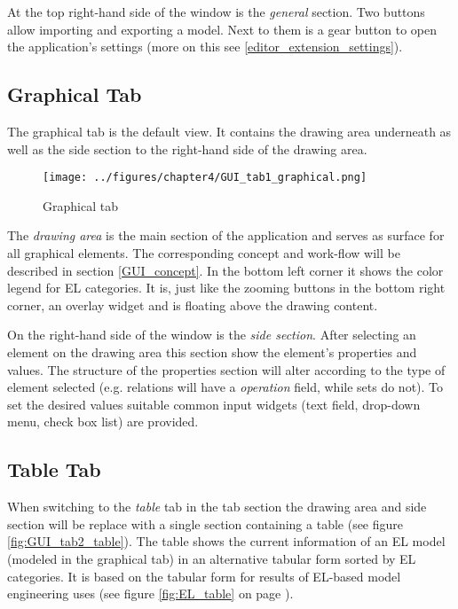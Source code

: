 \documentclass[twoside, openright, 12pt]{book}
\begin{document}
At the top right-hand side of the window is the \textit{general} section.
Two buttons allow importing and exporting a model.
Next to them is a gear button to open the application's settings (more on this see \ref{editor_extension_settings}).



\subsection{Graphical Tab}
\label{editor_graphical}
The graphical tab is the default view.
It contains the drawing area underneath as well as the side section to the right-hand side of the drawing area.

\begin{figure}[htb]
	\centering
	\texttt{[image: ../figures/chapter4/GUI\_tab1\_graphical.png]}
	\caption{Graphical tab}
	\label{fig:GUI_tab1_graphical}
\end{figure}

\noindent
The \textit{drawing area} is the main section of the application and serves as surface for all graphical elements.
The corresponding concept and work-flow will be described in section \ref{GUI_concept}.
In the bottom left corner it shows the color legend for EL categories.
It is, just like the zooming buttons in the bottom right corner, an overlay widget and is floating above the drawing content.

On the right-hand side of the window is the \textit{side section}.
After selecting an element on the drawing area this section show the element's properties and values.
The structure of the properties section will alter according to the type of element selected (e.g. relations will have a \textit{operation} field, while sets do not).
To set the desired values suitable common input widgets (text field, drop-down menu, check box list) are provided.



\subsection{Table Tab}
\label{editor_table}
When switching to the \textit{table} tab in the tab section the drawing area and side section will be replace with a single section containing a table (see figure \ref{fig:GUI_tab2_table}).
The table shows the current information of an EL model (modeled in the graphical tab) in an alternative tabular form sorted by EL categories.
It is based on the tabular form for results of EL-based model engineering \cite{Amthor18} uses (see figure \ref{fig:EL_table} on page \pageref{fig:EL_table}).
\end{document}
